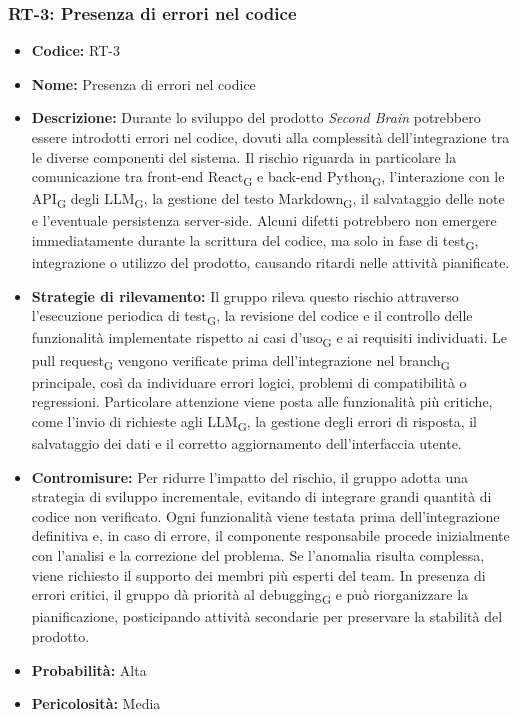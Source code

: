 \documentclass[a4paper, 10pt, colorlinks=true, linkcolor=black, urlcolor=blue, citecolor=blue, hidelinks]{article}
\begin{document}
\subsubsection{RT-3: Presenza di errori nel codice}

\begin{itemize}
    \item \textbf{Codice:} RT-3

    \item \textbf{Nome:} Presenza di errori nel codice

    \item \textbf{Descrizione:} Durante lo sviluppo del prodotto \textit{Second Brain} potrebbero essere introdotti errori nel codice, dovuti alla complessità dell'integrazione tra le diverse componenti del sistema. Il rischio riguarda in particolare la comunicazione tra front-end React\textsubscript{G} e back-end Python\textsubscript{G}, l'interazione con le API\textsubscript{G} degli LLM\textsubscript{G}, la gestione del testo Markdown\textsubscript{G}, il salvataggio delle note e l'eventuale persistenza server-side. Alcuni difetti potrebbero non emergere immediatamente durante la scrittura del codice, ma solo in fase di test\textsubscript{G}, integrazione o utilizzo del prodotto, causando ritardi nelle attività pianificate.

    \item \textbf{Strategie di rilevamento:} Il gruppo rileva questo rischio attraverso l'esecuzione periodica di test\textsubscript{G}, la revisione del codice e il controllo delle funzionalità implementate rispetto ai casi d'uso\textsubscript{G} e ai requisiti individuati. Le pull request\textsubscript{G} vengono verificate prima dell'integrazione nel branch\textsubscript{G} principale, così da individuare errori logici, problemi di compatibilità o regressioni. Particolare attenzione viene posta alle funzionalità più critiche, come l'invio di richieste agli LLM\textsubscript{G}, la gestione degli errori di risposta, il salvataggio dei dati e il corretto aggiornamento dell'interfaccia utente.

    \item \textbf{Contromisure:} Per ridurre l'impatto del rischio, il gruppo adotta una strategia di sviluppo incrementale, evitando di integrare grandi quantità di codice non verificato. Ogni funzionalità viene testata prima dell'integrazione definitiva e, in caso di errore, il componente responsabile procede inizialmente con l'analisi e la correzione del problema. Se l'anomalia risulta complessa, viene richiesto il supporto dei membri più esperti del team. In presenza di errori critici, il gruppo dà priorità al debugging\textsubscript{G} e può riorganizzare la pianificazione, posticipando attività secondarie per preservare la stabilità del prodotto.

    \item \textbf{Probabilità:} Alta

    \item \textbf{Pericolosità:} Media
\end{itemize}
\end{document}
